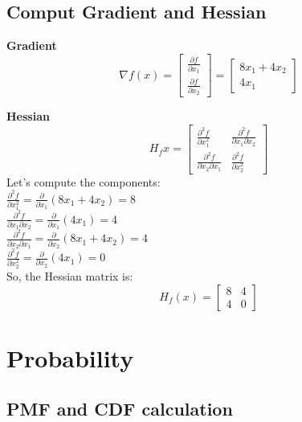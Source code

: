 \documentclass[11pt]{article}
\begin{document}
\subsection{Comput Gradient and Hessian}

\textbf{Gradient}
\[
\nabla f(x) = 
\begin{bmatrix}
    \frac{\partial{f}}{\partial{x_1}} \\
    \frac{\partial{f}}{\partial{x_2}}    
\end{bmatrix} = 
\begin{bmatrix}
    8x_1 + 4x_2 \\    
    4x_1
\end{bmatrix}
\]

\textbf{Hessian}
\[
H_{f}x = 
\left[\begin{array}{cc}
\frac{\partial^2 f}{\partial x_1^2} & \frac{\partial^2 f}{\partial x_1 \partial x_2} \\
\frac{\partial^2 f}{\partial x_2 \partial x_1} & \frac{\partial^2 f}{\partial x_2^2}
\end{array}\right]
\] 
Let's compute the components:\\
$\frac{\partial^2 f}{\partial x_1^2}=\frac{\partial}{\partial x_1}\left(8 x_1+4 x_2\right)=8$ \\
$\frac{\partial^2 f}{\partial x_1 \partial x_2}=\frac{\partial}{\partial x_1}\left(4 x_1\right)=4$ \\
$\frac{\partial^2 f}{\partial x_2 \partial x_1}=\frac{\partial}{\partial x_2}\left(8 x_1+4 x_2\right)=4$ \\
$\frac{\partial^2 f}{\partial x_2^2}=\frac{\partial}{\partial x_2}\left(4 x_1\right)=0$ \\

So, the Hessian matrix is:
\[
H_f(x)=\left[\begin{array}{ll}
8 & 4 \\
4 & 0
\end{array}\right]
\]

\section{Probability}

\subsection{PMF and CDF calculation}
\end{document}
